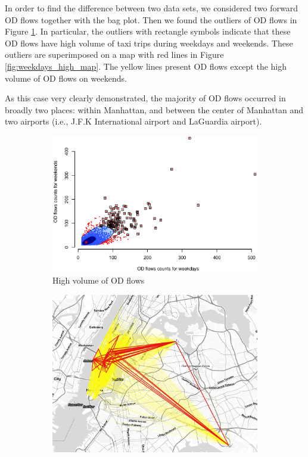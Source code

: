 \documentclass[a4paper,UKenglish]{lipics-v2016}
\begin{document}
In order to find the difference between two data sets, we considered two forward OD flows together with the bag plot. Then we found the outliers of OD flows in Figure \ref{fig:weekdays_high}. In particular, the outliers with rectangle symbols indicate that these OD flows have high volume of taxi trips during weekdays and weekends. These outliers are superimposed on a map with red lines in Figure \ref{fig:weekdays_high_map}. The yellow lines present OD flows except the high volume of OD flows on weekends. 

As this case very clearly demonstrated, the majority of OD flows occurred in broadly two places: within Manhattan, and between the center of Manhattan and two airports (i.e., J.F.K International airport and LaGuardia airport).  
 

\begin{figure}
	\centering
	\begin{subfigure}[b]{0.49\textwidth}
		\includegraphics[width=\textwidth]{images/Outliers_high_weekdays_weekends.eps}
		\caption{High volume of OD flows}
		\label{fig:weekdays_high}
	\end{subfigure}
	\hfill %
	\begin{subfigure}[b]{0.49\textwidth}
		\includegraphics[width=\textwidth]{images/outliers2_high_weekdays_weekends.png}

\end{subfigure}
\end{figure}
\end{document}
